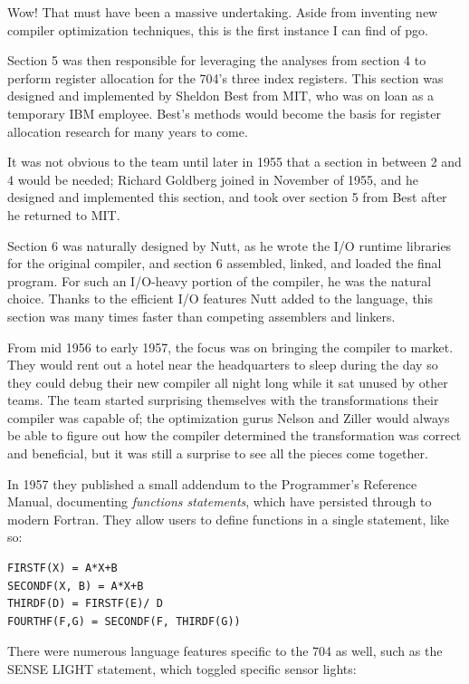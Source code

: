 Wow! That must have been a massive undertaking.
Aside from inventing new compiler optimization techniques, this is the first
instance I can find of \gls{pgo}.

Section 5 was then responsible for leveraging the analyses from section 4
to perform register allocation for the 704's three index registers.
This section was designed and implemented by Sheldon Best from MIT,
who was on loan as a temporary IBM employee.
Best's methods would become the basis for register allocation research for many years to come.

It was not obvious to the team until later in 1955 that a section in
between 2 and 4 would be needed; Richard Goldberg joined in November of 1955,
and he designed and implemented this section,
and took over section 5 from Best after he returned to MIT.

Section 6 was naturally designed by Nutt, as he wrote the I/O runtime libraries
for the original compiler, and section 6 assembled, linked, and loaded the final program.
For such an I/O-heavy portion of the compiler, he was the natural choice.
Thanks to the efficient I/O features Nutt added to the language, this section
was many times faster than competing assemblers and linkers.

From mid 1956 to early 1957, the focus was on bringing the compiler to market.
They would rent out a hotel near the headquarters to sleep during the day
so they could debug their new compiler all night long while it sat unused by other
teams.
The team started surprising themselves with the transformations their compiler
was capable of; the optimization gurus Nelson and Ziller would always be able to figure
out how the compiler determined the transformation was correct and beneficial, but
it was still a surprise to see all the pieces come together.

In 1957 they published a small addendum to the Programmer's Reference Manual,
documenting \textit{functions statements}, which have persisted through to modern Fortran.
They allow users to define functions in a single statement, like so:

\begin{lstlisting}
FIRSTF(X) = A*X+B
SECONDF(X, B) = A*X+B
THIRDF(D) = FIRSTF(E)/ D
FOURTHF(F,G) = SECONDF(F, THIRDF(G))
\end{lstlisting}

There were numerous language features specific to the 704 as well,
such as the SENSE LIGHT statement, which toggled specific sensor lights:

